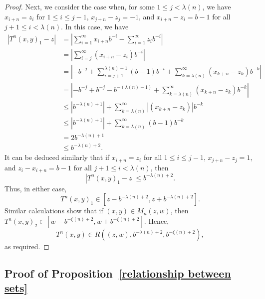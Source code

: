 \documentclass[12pt]{article}
\theoremstyle{remark}
\numberwithin{equation}{section}
\newcommand{\0}{\mathbf{0}}
\begin{document}
\begin{proof}
Next, we consider the case when, for some $1 \leq j < \lambda(n)$, we have $x_{i+n}=z_{i}$ for $1\leq i\leq j-1$, $x_{j+n}-z_{j}=-1$, and $x_{i+n}-z_{i}=b-1$ for all $j+1 \leq i < \lambda(n)$. In this case, we have 
 \begin{align*}
 \left|T^{n}(x,y)_{1}-z\right| &{= \left|\sum_{i=1}^{\infty}{x_{i+n}b^{-i}} - \sum_{i=1}^{\infty}{z_ib^{-i}}\right|} \\
 &{= \left| \sum_{i=j}^{\infty}{(x_{i+n}-z_i)b^{-i}} \right|} \\
 &= \left|-b^{-j}+\sum_{i=j+1}^{\lambda(n)-1}(b-1)b^{-i} +\sum_{k=\lambda(n)}^{\infty}(x_{k+n}-z_{k})b^{-k}\right| \\
 &=\left|-b^{-j} +b^{-j}-b^{-(\lambda(n)-1)} + \sum_{k=\lambda(n)}^{\infty}(x_{k+n}-z_{k})b^{-k}\right| \\
 & \leq \left|b^{-\lambda(n)+1}\right| + \sum_{k=\lambda(n)}^{\infty}|(x_{k+n}-z_k)|b^{-k} \\
 & \leq \left|b^{-\lambda(n)+1}\right| + \sum_{k=\lambda(n)}^{\infty}(b-1)b^{-k} \\
 & = 2 b^{-\lambda(n)+1} \\
 &\leq b^{-\lambda(n)+2}.
 \end{align*}
 It can be deduced similarly that if $x_{i+n}=z_i$ for all $1 \leq i \leq j-1$, $x_{j+n}-z_{j}=1$, and \mbox{$z_{i}-x_{i+n}=b-1$} for all $j+1 \leq i < \lambda(n)$, then
 \[|T^{n}(x,y)_{1}-z|\leq b^{-\lambda(n)+2}.\]
 Thus, in either case, 
 \[T^{n}(x,y)_{1} \in [z-b^{-\lambda(n)+2}, z+b^{-\lambda(n)+2}].\]  
 Similar calculations show that if $(x,y) \in M_n(z,w)$, then $T^{n}(x,y)_{2} \in [w-b^{-\xi(n)+2},w+b^{-\xi(n)+2}]$. Hence,
 \begin{equation*}
  T^{n}(x,y) \in R\left( (z,w), b^{-\lambda(n)+2}, b^{-\xi(n)+2} \right),
  \end{equation*}
  as required.
  \end{proof}








\subsection{Proof of Proposition~\ref{relationship between sets}}
\end{document}
